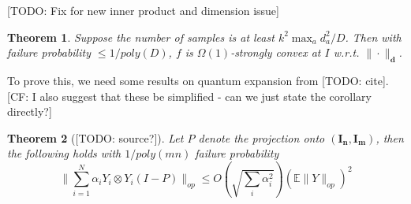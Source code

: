 \documentclass{article}
\newtheorem{theorem}{Theorem}
\renewcommand{\vec}{\bm}
\newcommand{\E}{\mathbb{E}}
\newcommand{\CF}[1]{{\color{purple}[CF: #1]}}
\newcommand{\TODO}[1]{{\color{blue}[TODO: #1]}}
\begin{document}
\TODO{Fix for new inner product and dimension issue}
\begin{theorem}\label{thm:tensor-convexity}
Suppose the number of samples is at least $k^{2} \max_{a} d_{a}^{2}/D$. Then with failure probability $\leq 1/poly(D)$, $f$ is $\Omega(1)$-strongly convex at $I$ w.r.t. $\|\cdot \|_{\vec d}$.
\end{theorem}
To prove this, we need some results on quantum expansion from \TODO{cite}. \CF{I also suggest that these be simplified - can we just state the corollary directly?}
\begin{theorem}[\TODO{source?}]
Let $P$ denote the projection onto $(\vec{I_{n}},\vec{I_{m}})$, then the following holds with $1/poly(mn)$ failure probability
\[ \|\sum_{i=1}^{N} \alpha_{i} Y_{i} \otimes Y_{i} (I - P) \|_{op} \leq O \left( \sqrt{\sum_{i} \alpha_{i}^{2}} \right) \left( \E \|Y\|_{op} \right)^{2} \]
\end{theorem}
\end{document}
